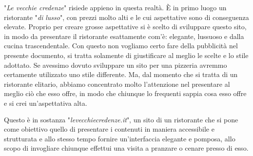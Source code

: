 "\textit{Le vecchie credenze}" risiede appieno in questa realtà. È in primo luogo un ristorante "\textit{di lusso}", con prezzi molto alti e le cui aspettative sono di conseguenza elevate. Proprio per creare grosse aspettative si è scelto di sviluppare questo sito, in modo da presentare il ristorante esattamente com'è: elegante, lussuoso e dalla cucina trascendentale. Con questo non vogliamo certo fare della pubblicità nel presente documento, si tratta solamente di giustificare al meglio le scelte e lo stile adottato. Se avessimo dovuto sviluppare un sito per una pizzeria avremmo certamente utilizzato uno stile differente. Ma, dal momento che si tratta di un ristorante elitario, abbiamo concentrato molto l'attenzione nel presentare al meglio ciò che esso offre, in modo che chiunque lo frequenti sappia cosa esso offre e si crei un'aspettativa alta.

Questo è in sostanza "\textit{levecchiecredenze.it}", un sito di un ristorante che si pone come obiettivo quello di presentare i contenuti in maniera accessibile e strutturata e allo stesso tempo fornire un'interfaccia elegante e pomposa, allo scopo di invogliare chiunque effettui una visita a pranzare o cenare presso di esso.